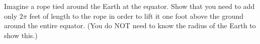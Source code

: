 {Imagine a rope tied around the Earth at the equator.  Show that you need to add only $2\pi$ feet of length to the rope in order to lift it one foot above the ground around the entire equator.  (You do NOT need to know the radius of the Earth to show this.)}
{}
